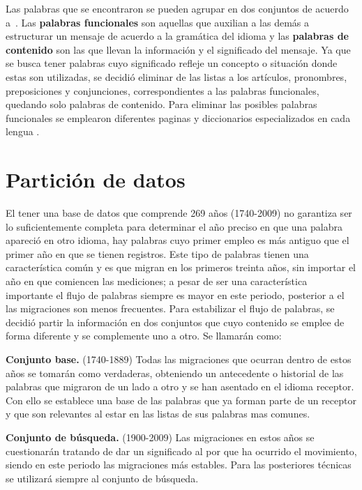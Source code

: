 Las palabras que se encontraron se pueden agrupar en dos conjuntos de acuerdo
a~\cite{contenidopal}. Las \textbf{palabras funcionales} son aquellas que
auxilian a las demás a estructurar un mensaje de acuerdo a la gramática del
idioma y las \textbf{palabras de contenido} son las que llevan la información
y el significado del mensaje. Ya  que se busca tener palabras cuyo significado
refleje un concepto o situación donde estas son utilizadas, se decidió eliminar
de las listas a los artículos, pronombres, preposiciones y conjunciones,
correspondientes a las palabras funcionales, quedando solo palabras de
contenido. Para eliminar las posibles palabras funcionales se emplearon
diferentes paginas y diccionarios especializados en cada lengua
\cite{englishdic, frenchdic, germandic, italiandic, spanishdic}. 

\section{Partición de datos} %

El tener una base de datos que comprende 269 años (1740-2009) no garantiza ser
lo suficientemente completa para determinar el año preciso en que una palabra
apareció en otro idioma, hay palabras cuyo primer empleo es más antiguo que el
primer año en que se tienen registros. Este tipo de palabras tienen una
característica común y es que migran en los primeros treinta años, sin importar
el año en que comiencen las mediciones; a pesar de ser una característica
importante el flujo de palabras siempre es mayor en este periodo, posterior a
el las migraciones son menos frecuentes. Para estabilizar el flujo de palabras,
se decidió partir la información en dos conjuntos que cuyo contenido se emplee
de forma diferente y se complemente uno a otro.  Se llamarán como:

\textbf{Conjunto base.} (1740-1889) Todas las migraciones que ocurran dentro de
estos años se tomarán como verdaderas, obteniendo un antecedente o historial de
las palabras que migraron de un lado a otro y se han asentado en el idioma
receptor. Con ello se establece una base de las palabras que ya forman parte de
un receptor y que son relevantes al estar en las listas de sus palabras mas
comunes. 

\textbf{Conjunto de búsqueda.} (1900-2009) Las migraciones en estos años se
cuestionarán tratando de dar un significado al por que ha ocurrido el
movimiento,  siendo en este periodo las migraciones más estables. Para las
posteriores técnicas se utilizará siempre al conjunto de búsqueda.

